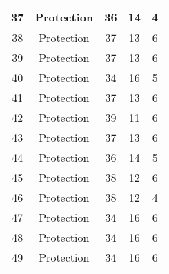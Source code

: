 \documentclass[results.tex]{subfiles}
\begin{document}
\begin{center}
\begin{tabular}{| c || c | c | c | c |}
            \hline
            37                      & Protection                   & 36                     & 14                      & 4                    \\
            \hline
            38                      & Protection                   & 37                     & 13                      & 6                    \\
            \hline
            39                      & Protection                   & 37                     & 13                      & 6                    \\
            \hline
            40                      & Protection                   & 34                     & 16                      & 5                    \\
            \hline
            41                      & Protection                   & 37                     & 13                      & 6                    \\
            \hline
            42                      & Protection                   & 39                     & 11                      & 6                    \\
            \hline
            43                      & Protection                   & 37                     & 13                      & 6                    \\
            \hline
            44                      & Protection                   & 36                     & 14                      & 5                    \\
            \hline
            45                      & Protection                   & 38                     & 12                      & 6                    \\
            \hline
            46                      & Protection                   & 38                     & 12                      & 4                    \\
            \hline
            47                      & Protection                   & 34                     & 16                      & 6                    \\
            \hline
            48                      & Protection                   & 34                     & 16                      & 6                    \\
            \hline
            49                      & Protection                   & 34                     & 16                      & 6                    \\
            \hline
        \end{tabular}
    \end{center}
\end{document}
